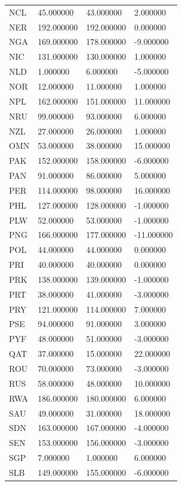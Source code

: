 \begin{tabular}{llll}
NCL & 45.000000 & 43.000000 & 2.000000 \\
NER & 192.000000 & 192.000000 & 0.000000 \\
NGA & 169.000000 & 178.000000 & -9.000000 \\
NIC & 131.000000 & 130.000000 & 1.000000 \\
NLD & 1.000000 & 6.000000 & -5.000000 \\
NOR & 12.000000 & 11.000000 & 1.000000 \\
NPL & 162.000000 & 151.000000 & 11.000000 \\
NRU & 99.000000 & 93.000000 & 6.000000 \\
NZL & 27.000000 & 26.000000 & 1.000000 \\
OMN & 53.000000 & 38.000000 & 15.000000 \\
PAK & 152.000000 & 158.000000 & -6.000000 \\
PAN & 91.000000 & 86.000000 & 5.000000 \\
PER & 114.000000 & 98.000000 & 16.000000 \\
PHL & 127.000000 & 128.000000 & -1.000000 \\
PLW & 52.000000 & 53.000000 & -1.000000 \\
PNG & 166.000000 & 177.000000 & -11.000000 \\
POL & 44.000000 & 44.000000 & 0.000000 \\
PRI & 40.000000 & 40.000000 & 0.000000 \\
PRK & 138.000000 & 139.000000 & -1.000000 \\
PRT & 38.000000 & 41.000000 & -3.000000 \\
PRY & 121.000000 & 114.000000 & 7.000000 \\
PSE & 94.000000 & 91.000000 & 3.000000 \\
PYF & 48.000000 & 51.000000 & -3.000000 \\
QAT & 37.000000 & 15.000000 & 22.000000 \\
ROU & 70.000000 & 73.000000 & -3.000000 \\
RUS & 58.000000 & 48.000000 & 10.000000 \\
RWA & 186.000000 & 180.000000 & 6.000000 \\
SAU & 49.000000 & 31.000000 & 18.000000 \\
SDN & 163.000000 & 167.000000 & -4.000000 \\
SEN & 153.000000 & 156.000000 & -3.000000 \\
SGP & 7.000000 & 1.000000 & 6.000000 \\
SLB & 149.000000 & 155.000000 & -6.000000 \\

\end{tabular}
